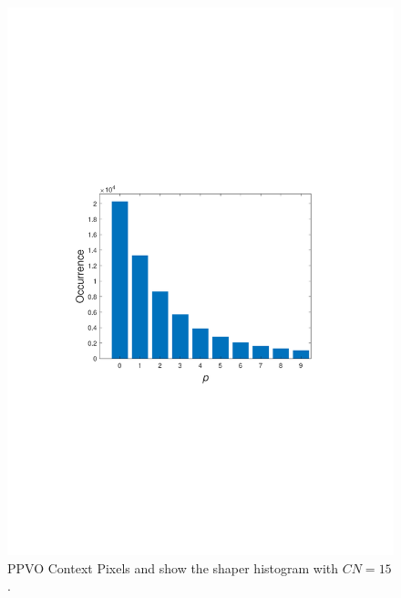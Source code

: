 \documentclass[review,3p,10pt,sort&compress]{elsarticle}
\begin{document}
\begin{figure}
{\begin{minipage}[t]{0.42\linewidth}
    \includegraphics[width=1\textwidth]{figures/PPVO_Lena_CN15_hist.pdf}
    \end{minipage}
}		
\centering
\caption{PPVO Context Pixels and show the shaper histogram with $CN = 15$.}
\label{Fig.PPVOCNandHist}
\end{figure}
\end{document}
